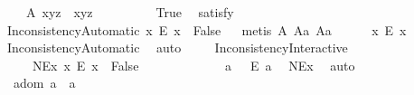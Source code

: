 \begin{isabellebody}
\ \ \ \ A{}{\isacharcolon}\ {\isachardoublequoteopen}x{\isasymcdot}{\isacharparenleft}y{\isasymcdot}z{\isacharparenright}\ {\isasymcong}\ {\isacharparenleft}x{\isasymcdot}y{\isacharparenright}{\isasymcdot}z{\isachardoublequoteclose}\ \ \isanewline
\ \ \isanewline
\ \ \ \isamarkupfalse%
\ True\ \isamarkupfalse%
\ {\isacharbrackleft}satisfy{\isacharbrackright}%
\isadelimproof
\ %
\endisadelimproof
%
\isatagproof
{}\isamarkupfalse%
\ \ %
%
\endisatagproof
{\isafoldproof}%
%
\isadelimproof
%
\endisadelimproof
\isanewline
\ \ \ \isanewline
\ \ \ \isamarkupfalse%
\ InconsistencyAutomatic{\isacharcolon}\ {\isachardoublequoteopen}{\isacharparenleft}{\isasymexists}x{\isachardot}\ \isactrlbold {\isasymnot}{\isacharparenleft}E\ x{\isacharparenright}{\isacharparenright}\ \isactrlbold {\isasymrightarrow}\ False{\isachardoublequoteclose}%
\isadelimproof
\ %
\endisadelimproof
%
\isatagproof
{}\isamarkupfalse%
\ {\isacharparenleft}metis\ A{}\ A{}a\ A{}a{\isacharparenright}\ %
%
\endisatagproof
{\isafoldproof}%
%
\isadelimproof
%
\endisadelimproof
\isanewline
\ \ \ \isamarkupfalse%
\ {\isachardoublequoteopen}{\isasymforall}x{\isachardot}\ E\ x{\isachardoublequoteclose}%
\isadelimproof
\ %
\endisadelimproof
%
\isatagproof
{}\isamarkupfalse%
\ InconsistencyAutomatic\ \isamarkupfalse%
\ auto%
\endisatagproof
{\isafoldproof}%
%
\isadelimproof
%
\endisadelimproof
\isanewline
\isanewline
\ \ \ \isamarkupfalse%
\ InconsistencyInteractive{\isacharcolon}\ \isanewline
\ \ \ \ \ NEx{\isacharcolon}\ {\isachardoublequoteopen}{\isasymexists}x{\isachardot}\ \isactrlbold {\isasymnot}{\isacharparenleft}E\ x{\isacharparenright}{\isachardoublequoteclose}\ \ False\ \isanewline
%
\isadelimproof
\ \ \ \ %
\endisadelimproof
%
\isatagproof
{}\isamarkupfalse%
\ {\isacharminus}\isanewline
\ \ \ \ \isamarkupfalse%
\ a\ \ {}{\isacharcolon}\ {\isachardoublequoteopen}\isactrlbold {\isasymnot}{\isacharparenleft}E\ a{\isacharparenright}{\isachardoublequoteclose}\ \isamarkupfalse%
\ NEx\ \isamarkupfalse%
\ auto\isanewline
\ \ \ \ \isamarkupfalse%
\ {}{\isacharcolon}\ {\isachardoublequoteopen}a{\isasymcdot}{\isacharparenleft}dom\ a{\isacharparenright}\ {\isasymcong}\ a{\isachardoublequoteclose}\ \isamarkupfalse%

\end{isabellebody}
